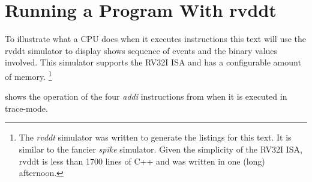 \section{Running a Program With rvddt}

To illustrate what a CPU does when it executes instructions this text
will use the \gls{rvddt} simulator to display shows sequence of events
and the binary values involved.  This simulator supports the RV32I ISA
and has a configurable amount of memory.%
\footnote{The {\em rvddt} simulator was written to generate the listings for
this text.  It is similar to the fancier {\em spike} simulator.
Given the simplicity of the RV32I ISA, rvddt is less than 1700 lines of C++
and was written in one (long) afternoon.}

 shows the operation of the four
{\em addi} instructions from  when it is executed
in trace-mode.


